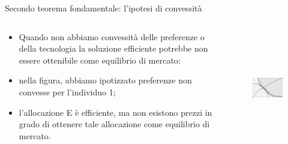 \documentclass[aspectratio=64,12pt]{beamer}
\begin{document}
\begin{frame}{Secondo teorema fondamentale: l'ipotesi di convessità}
\begin{columns}
\begin{column}{.45\columnwidth}
\small
\begin{itemize}
\item Quando non abbiamo convessità delle preferenze o della tecnologia la soluzione efficiente potrebbe non essere ottenibile come equilibrio di mercato:
\item nella figura, abbiamo ipotizzato preferenze non convesse per l’individuo 1;
\item l’allocazione E è efficiente, ma non esistono prezzi in grado di ottenere tale allocazione come equilibrio di mercato.
\end{itemize}
\end{column}

\begin{column}{.55\columnwidth}
\begin{figure}
\centering
\includegraphics[height=5cm]{./figure/edgeworth-7.pdf}
\end{figure}
\end{column}
\end{columns}
\end{frame}
\end{document}
